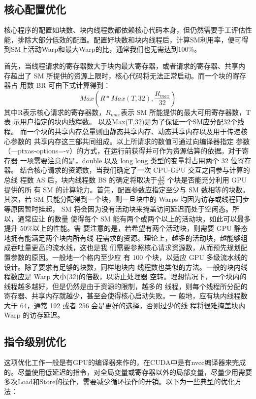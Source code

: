 \subsection{核心配置优化}
核心程序的配置如块数、块内线程数都依赖核心代码本身，但仍然需要手工评估性能，排除大部分低效的配置。配置好块数和块内线程后，计算SM利用率，便可得到SM上活动Warp和最大Warp的比，通常我们也无需达到100\%。

首先，当线程请求的寄存器数大于块内最大寄存器，或者请求的寄存器、共享内
存超出了 SM 所提供的资源上限时，核心代码将无法正常启动。而一个块的寄存器占
用数 BR 可由下式计算得到：
\begin{equation}
Max(R*Max(T,32),\frac{R_{max}}{32})
\end{equation}
其中R表示核心请求的寄存器数，$R_{max}$表示 SM 所能提供的最大可用寄存器数，T 表
示用户指定的块内线程数。 以及Max(T,32)是为了保证一个SM应分配32个线程。
而一个块的共享内存总量则由静态共享内存、动态共享内存以及用于传递核心参数的
共享内存这三部共同组成。以上所请求的数值可通过向编译器指定 参数
（—ptxas-options=-v）的方式，在运行前获得并可作为资源估算的依据。对于寄存器
一项需要注意的是，double 以及 long long 类型的变量将占用两个 32 位寄存器。
结合核心请求的资源数，当我们确定了一次 CPU-GPU 交互之间参与计算的总线
程数 AS 后，块内线程数 BS 的确定将取决于$\frac{AS}{BS}$
个块是否能充分利用 GPU 提供的所
有 SM 的计算能力。首先，配置参数应指定至少与 SM 数相等的块数。其次，若 SM
只能分配得到一个块，则一旦块中的 Warps 均因为访存或线程同步等原因暂时挂起，
SM 将会因为没有活动块来掩盖访问延迟而处于空闲态。所以，通常应让 的数量
使得每个 SM 能有两个或两个以上的活动块，如此可以最多提升 50\%以上的性能。需
要注意的是，若希望有两个活动块，则需要 GPU 静态地拥有能满足两个块内所有线
程需求的资源。理论上，越多的活动块，越能够组成吞吐量更高的流水线，这也是我
们需要参照核心请求资源数，从而预先规划配置参数的原因。一般地一个格内至少应
有 100 个块，以适应 GPU 多级流水线的设计。除了要求有足够的块数，同样地块内
线程数也类似的方法。一般的块内线程数应是 Warp 大小(32)的倍数，以防止处理器
空转。理想情况下，一个块内的线程越多越好，但是仍然是由于资源的限制，越多的
线程，则每个线程所分配的寄存器、共享内存就越少，甚至会使得核心启动失败。一
般地，应有块内线程数大于 64，通常 192 或者 256 会是更好的选择，否则过少的线
程将很难掩盖块内 Warp 的访存延迟。

\subsection{指令级别优化}
这项优化工作一般是有GPU的编译器来作的，在CUDA中是有nvcc编译器来完成的。尽量使用低延迟的指令，对全局变量或寄存器以外的局部变量，尽量少用需要多次Load和Store的操作，需要减少循环操作的开销。以下为一些典型的优化方法：

